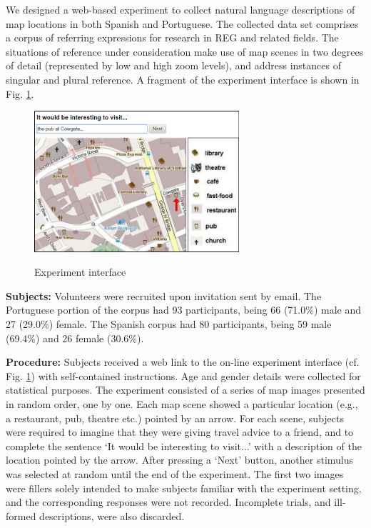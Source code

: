 \documentclass[11pt]{article}
\begin{document}
We designed a web-based experiment to collect natural language descriptions of map locations in both Spanish and Portuguese. The collected data set comprises a corpus of referring expressions for research in REG and related fields. The situations of reference under consideration make use of map scenes in two degrees of detail (represented by low and high zoom levels), and address instances of singular and plural reference. A fragment of the experiment interface is shown in Fig. \ref{fig-interface}.

\begin{figure}[ht]
\begin{center}
\includegraphics[width=7.6cm]{figures/interface.png}\\[0pt]
\caption{Experiment interface}
\label{fig-interface}
\end{center}
\end{figure}

{\bf Subjects:} Volunteers were recruited upon  invitation sent by email. The Portuguese portion of the corpus had 93 participants, being 66 (71.0\%) male and 27 (29.0\%) female. The Spanish corpus had 80 participants, being 59 male (69.4\%) and 26 female (30.6\%).

{\bf Procedure:} Subjects received a web link to the on-line experiment interface (cf. Fig. \ref{fig-interface}) with self-contained instructions. Age and gender details were collected for statistical purposes. The experiment consisted of a series of map images presented in random order, one by one. Each map scene showed a particular location (e.g., a restaurant, pub, theatre etc.) pointed by an arrow. For each scene, subjects were required to imagine that they were giving travel advice to a friend, and to complete the sentence `It would be interesting to visit...' with a description of the location pointed by the arrow. After pressing a `Next' button, another stimulus was selected at random until the end of the experiment. The first two images were fillers solely intended to make subjects familiar with the experiment setting, and the corresponding responses were not recorded. Incomplete trials, and ill-formed descriptions, were also discarded. 
\end{document}
